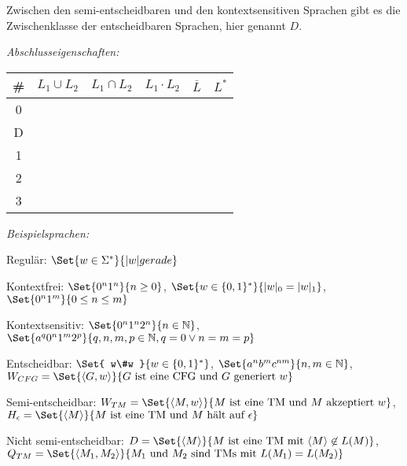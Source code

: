 \documentclass{cheat-sheet}
\newcommand{\cmark}{\ding{51}}
\newcommand{\xmark}{\ding{55}}
\begin{document}
\begin{bem}
  Zwischen den semi-entscheidbaren und den kontextsensitiven Sprachen gibt es die Zwischenklasse der entscheidbaren Sprachen, hier genannt $D$.
\end{bem}

\emph{Abschlusseigenschaften:}

\begin{center}
  \begin{tabular}{ c | c | c | c | c | c }
    \# & $L_{1} \cup L_{2}$ & $L_{1} \cap L_{2}$ & $L_{1} \cdot L_{2}$ & $\overline{L}$ & $L^{*}$ \\
    \hline
    0 & \cmark & \cmark & \cmark & \xmark & \cmark \\
    D & \cmark & \cmark & \cmark & \cmark & \cmark \\
    1 & \cmark & \cmark & \cmark & \cmark & \cmark \\
    2 & \cmark & \xmark & \cmark & \xmark & \cmark \\
    3 & \cmark & \cmark & \cmark & \cmark & \cmark
  \end{tabular}
\end{center}


\emph{Beispielsprachen:}

Regulär: $\Set{ w \in \Sigma^{*} }{ |w| gerade }$

Kontextfrei:
$\Set{0^{n}1^{n}}{n \ge 0}$,
$\Set{w \in \{ 0, 1 \}^{*}}{|w|_{0} = |w|_{1}}$,
$\Set{0^{n}1^{m}}{0 \le n \le m}$

Kontextsensitiv:
$\Set{0^{n}1^{n}2^{n}}{n \in \mathbb{N}}$,
$\Set{a^{q}0^{n}1^{m}2^{p}}{q, n, m, p \in \mathbb{N}, q = 0 \vee n = m = p}$

Entscheidbar:
$\Set{ w\#w }{w \in \{ 0, 1 \}^{*}}$,
$\Set{a^{n}b^{m}c^{nm}}{n, m \in \mathbb{N}}$,
$W_{CFG} = \Set{ \langle G, w \rangle }{ G \text{ ist eine CFG und } G \text{ generiert } w }$

Semi-entscheidbar:
$W_{TM} = \Set{ \langle M, w \rangle }{M \text{ ist eine TM und } M \text{ akzeptiert } w}$,
$H_{\epsilon} = \Set{ \langle M \rangle }{ M \text{ ist eine TM und } M \text{ hält auf } \epsilon }$

Nicht semi-entscheidbar:
$D = \Set{ \langle M \rangle }{ M \text{ ist eine TM mit } \langle M \rangle \not\in L(M) }$,
$Q_{TM} = \Set{ \langle M_{1}, M_{2} \rangle }{ M_{1} \text{ und } M_{2} \text{ sind TMs mit } L(M_{1}) = L(M_{2}) }$
\end{document}
